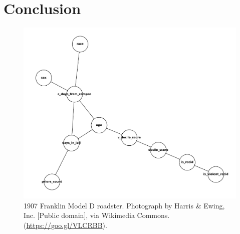 \documentclass[acmsmall,sigconf]{acmart}
\begin{document}
\section{Conclusion}



\begin{figure}[h]
  \centering
  \includegraphics[width=\linewidth]{compas_mst}
  \caption{1907 Franklin Model D roadster. Photograph by Harris \&
    Ewing, Inc. [Public domain], via Wikimedia
    Commons. (\url{https://goo.gl/VLCRBB}).}
\end{figure}
\end{document}
